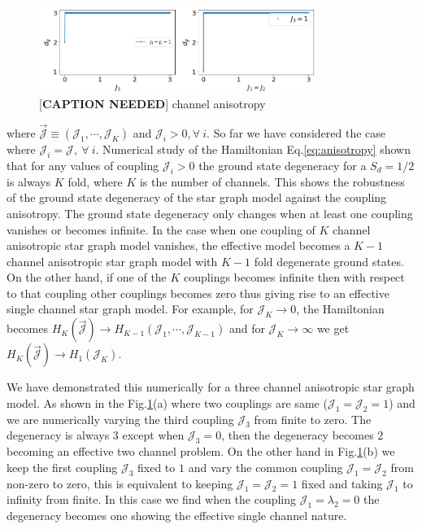 \documentclass[reprint,prb,superscriptaddress]{revtex4-2}
\begin{document}
\begin{figure}
	\centering
\includegraphics[width=0.8\textwidth]{plt/Anisotropy_Channel_3.png}
\caption{[\textbf{CAPTION NEEDED}] channel anisotropy}
\label{fig:channel-anisotropy}
\end{figure}
where $ \vec{{\mathcal{J}}} \equiv ({\mathcal{J}}_1,\cdots,{\mathcal{J}}_K)$ and ${\mathcal{J}}_i>0, \forall~i$. So far we have considered the case where ${\mathcal{J}}_i={\mathcal{J}},~\forall~i$. Numerical study of the Hamiltonian Eq.\eqref{eq:anisotropy} shown that for any values of coupling ${\mathcal{J}}_i>0$ the ground state degeneracy for a $S_d=1/2$ is always $K$ fold, where $K$ is the number of channels. This shows the robustness of the ground state degeneracy of the star graph model against the coupling anisotropy. The ground state degeneracy only changes when at least one coupling vanishes or becomes infinite. In the case when one coupling of $K$ channel anisotropic star graph model vanishes, the effective model becomes a $K-1$ channel anisotropic star graph model with $K-1$ fold degenerate ground states. On the other hand, if one of the $K$ couplings becomes infinite then with respect to that coupling other couplings becomes zero thus giving rise to an effective single channel star graph model. For example, for ${\mathcal{J}}_K\rightarrow 0$, the Hamiltonian becomes $H_{K}(\vec{{\mathcal{J}}})\rightarrow H_{K-1}({\mathcal{J}}_1,\cdots,{\mathcal{J}}_{K-1})$ and for ${\mathcal{J}}_K\rightarrow \infty$ we get $H_{K}(\vec{{\mathcal{J}}}) \rightarrow H_{1}({\mathcal{J}}_K)$. 

We have demonstrated this numerically for a three channel anisotropic star graph model. As shown in the Fig.\ref{fig:channel-anisotropy}(a) where two couplings are same (${\mathcal{J}}_1={\mathcal{J}}_2=1$) and we are numerically varying the third coupling ${\mathcal{J}}_3$ from finite to zero. The degeneracy is always $3$ except when ${\mathcal{J}}_3=0$, then the degeneracy becomes $2$ becoming an effective two channel problem. On the other hand in Fig.\ref{fig:channel-anisotropy}(b) we keep the first coupling ${\mathcal{J}}_3$ fixed to $1$ and vary the common coupling ${\mathcal{J}}_1={\mathcal{J}}_2$ from non-zero to zero, this is equivalent to keeping ${\mathcal{J}}_1={\mathcal{J}}_2=1$ fixed and taking ${\mathcal{J}}_1$ to infinity from finite. In this case we find when the coupling ${\mathcal{J}}_1=\lambda_2=0$ the degeneracy becomes one showing the effective single channel nature.
\end{document}
